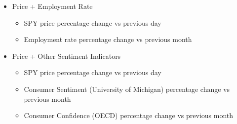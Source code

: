 \begin{itemize}
    \item Price + Employment Rate
    \begin{itemize}
        \item SPY price percentage change vs previous day
        \item Employment rate percentage change vs previous month
    \end{itemize}
    \item Price + Other Sentiment Indicators
    \begin{itemize}
        \item SPY price percentage change vs previous day
        \item Consumer Sentiment (University of Michigan) percentage change vs previous month
        \item Consumer Confidence (OECD) percentage change vs previous month
    \end{itemize}
\end{itemize}